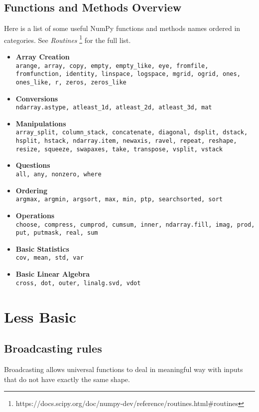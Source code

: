\documentclass[UTF8]{article}
\begin{document}
\subsection{Functions and Methods Overview}
Here is a list of some useful NumPy functions and methods names ordered in categories. See
\emph{Routines} \footnote{https://docs.scipy.org/doc/numpy-dev/reference/routines.html\#routines}
for the full list.
\begin{itemize}
    \item \textbf{Array Creation} \\
    \texttt{arange, array, copy, empty, empty\_like, eye, fromfile, fromfunction, identity,
    linspace, logspace, mgrid, ogrid, ones, ones\_like, r, zeros, zeros\_like}
    \item \textbf{Conversions} \\
    \texttt{ndarray.astype, atleast\_1d, atleast\_2d, atleast\_3d, mat}
    \item \textbf{Manipulations} \\
    \texttt{array\_split, column\_stack, concatenate, diagonal, dsplit, dstack, hsplit, hstack,
    ndarray.item, newaxis, ravel, repeat, reshape, resize, squeeze, swapaxes, take, transpose,
    vsplit, vstack}
    \item \textbf{Questions} \\
    \texttt{all, any, nonzero, where}
    \item \textbf{Ordering} \\
    \texttt{argmax, argmin, argsort, max, min, ptp, searchsorted, sort}
    \item \textbf{Operations} \\
    \texttt{choose, compress, cumprod, cumsum, inner, ndarray.fill, imag, prod, put, putmask, real,
    sum}
    \item \textbf{Basic Statistics} \\
    \texttt{cov, mean, std, var}
    \item \textbf{Basic Linear Algebra} \\
    \texttt{cross, dot, outer, linalg.svd, vdot}
\end{itemize}

\section{Less Basic}
\subsection{Broadcasting rules}
Broadcasting allows universal functions to deal in meaningful way with inputs that do not have
exactly the same shape.
\end{document}
